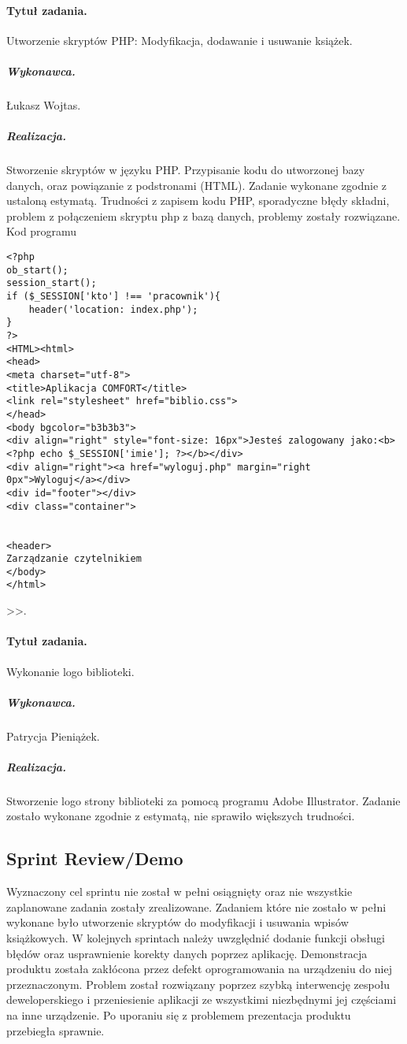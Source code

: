 \documentclass[a4paper]{article}
\begin{document}
\paragraph{Tytuł zadania.}  Utworzenie skryptów PHP: Modyfikacja, dodawanie i usuwanie książek.
\subparagraph{Wykonawca.} Łukasz Wojtas.
\subparagraph{Realizacja.} Stworzenie skryptów w języku PHP. Przypisanie kodu do utworzonej bazy danych, oraz powiązanie z podstronami (HTML). Zadanie wykonane zgodnie z ustaloną estymatą. Trudności z zapisem kodu PHP, sporadyczne błędy składni, problem z połączeniem skryptu php z bazą danych, problemy zostały rozwiązane.
Kod programu 
\begin{verbatim}
<?php
ob_start();
session_start();
if ($_SESSION['kto'] !== 'pracownik'){
	header('location: index.php');
}
?>
<HTML><html>
<head>
<meta charset="utf-8">
<title>Aplikacja COMFORT</title>
<link rel="stylesheet" href="biblio.css">
</head>
<body bgcolor="b3b3b3">
<div align="right" style="font-size: 16px">Jesteś zalogowany jako:<b><?php echo $_SESSION['imie']; ?></b></div>
<div align="right"><a href="wyloguj.php" margin="right 0px">Wyloguj</a></div>
<div id="footer"></div> 
<div class="container">
  

<header>
Zarządzanie czytelnikiem
</body>
</html>
\end{verbatim}>>.

\paragraph{Tytuł zadania.} Wykonanie logo biblioteki.
\subparagraph{Wykonawca.} Patrycja Pieniążek.
\subparagraph{Realizacja.}Stworzenie logo strony biblioteki za pomocą programu  Adobe Illustrator. Zadanie zostało wykonane zgodnie z estymatą, nie sprawiło większych trudności.

\subsection{Sprint Review/Demo}
Wyznaczony cel sprintu nie został w pełni osiągnięty oraz nie wszystkie zaplanowane zadania zostały zrealizowane. Zadaniem które nie zostało w pełni wykonane było utworzenie skryptów do modyfikacji i usuwania wpisów książkowych. W kolejnych sprintach należy uwzględnić dodanie funkcji obsługi błędów oraz usprawnienie korekty danych poprzez aplikację. Demonstracja produktu została zakłócona przez defekt oprogramowania na urządzeniu do niej przeznaczonym. Problem został rozwiązany poprzez szybką interwencję zespołu deweloperskiego i przeniesienie aplikacji ze wszystkimi niezbędnymi jej częściami na inne urządzenie. Po uporaniu się z problemem prezentacja produktu przebiegła sprawnie.
\end{document}
